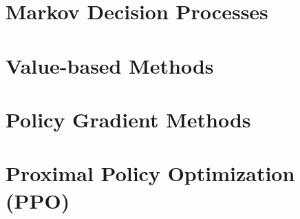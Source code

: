 \section{Markov Decision Processes}


\section{Value-based Methods}


\section{Policy Gradient Methods}


\section{Proximal Policy Optimization (PPO)}

